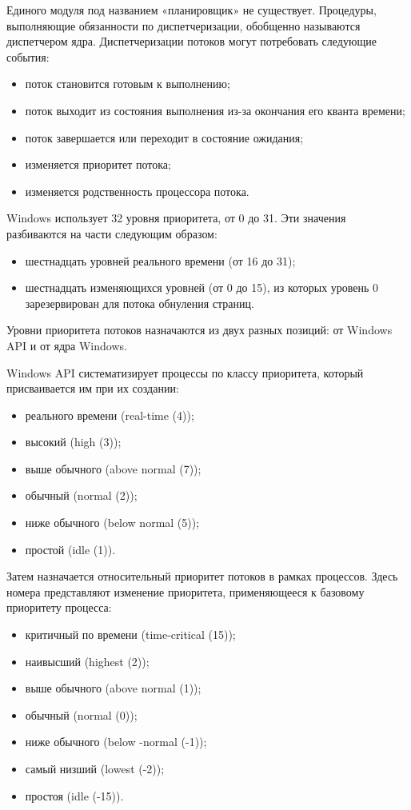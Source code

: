 Единого модуля под названием «планировщик» не существует. Процедуры, выполняющие обязанности по диспетчеризации, обобщенно называются диспетчером ядра.   Диспетчеризации потоков могут потребовать следующие события:

\begin{itemize}
	\item поток становится готовым к выполнению;
	\item поток выходит из состояния выполнения из-за окончания его кванта времени;
	\item поток завершается или переходит в состояние ожидания;
	\item изменяется приоритет потока;
	\item изменяется родственность процессора потока.
\end{itemize}


Windows использует 32 уровня приоритета, от 0 до 31. Эти значения  разбиваются на части следующим образом:
\begin{itemize}
		\item шестнадцать уровней реального времени (от 16 до 31);
		\item шестнадцать изменяющихся уровней (от 0 до 15), из которых уровень 0 зарезервирован для потока обнуления страниц. 
\end{itemize}
 

Уровни приоритета потоков назначаются из двух разных позиций: от Windows API и от ядра Windows.

Windows API систематизирует процессы по классу приоритета, который присваивается им при их создании:
\begin{itemize}
	\item реального времени (real-time (4));
	\item высокий (high (3));
	\item выше обычного (above normal (7));
	\item обычный (normal (2));
	\item ниже обычного (below normal (5));
	\item простой (idle (1)).
\end{itemize}

Затем назначается относительный приоритет потоков в рамках процессов. Здесь номера представляют изменение приоритета, применяющееся к базовому приоритету процесса:
\begin{itemize}
	\item критичный по времени (time-critical (15));
	\item наивысший (highest (2));
	\item выше обычного (above normal (1));
	\item обычный (normal (0));
	\item ниже обычного (below -normal (-1));
	\item самый низший (lowest (-2));
	\item простоя (idle (-15)).
\end{itemize}


